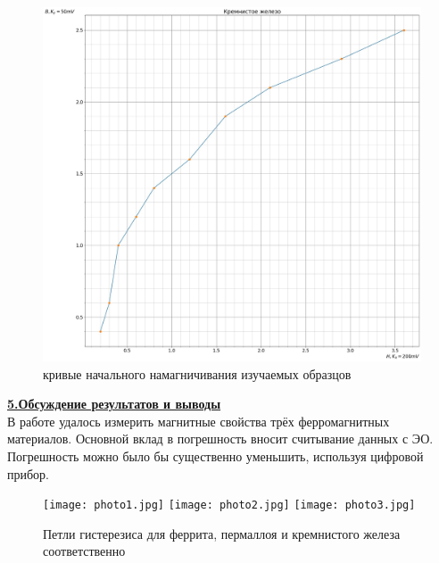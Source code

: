\documentclass[12pt, letterpaper, oneside]{article}
\begin{document}
\begin{figure}[H]
\begin{center}
\includegraphics[scale = 0.15]{3.jpg}
\end{center}
\caption{кривые начального намагничивания изучаемых образцов}
\end{figure}
\noindent\textbf{\underline{5.Обсуждение результатов и выводы}}\\
В работе удалось измерить магнитные свойства трёх ферромагнитных материалов. Основной вклад в погрешность вносит считывание данных с ЭО. Погрешность можно было бы существенно уменьшить, используя цифровой прибор.
\begin{figure}[h]
\texttt{[image: photo1.jpg]}
\texttt{[image: photo2.jpg]}
\texttt{[image: photo3.jpg]}
\caption{Петли гистерезиса для феррита, пермаллоя и кремнистого железа соответственно}
\end{figure}
\end{document}
